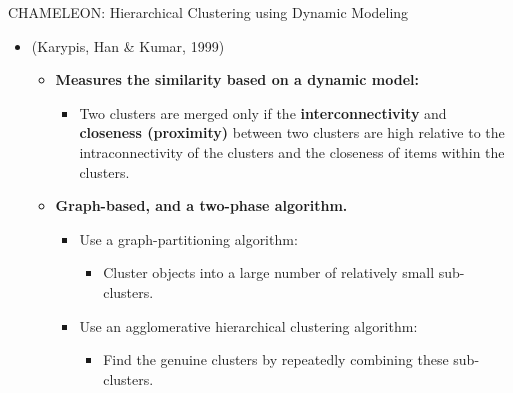 \begin{frame}{CHAMELEON: Hierarchical Clustering using Dynamic Modeling}
	\begin{itemize}
		\item (Karypis, Han \& Kumar, 1999)
		\begin{itemize}
			\item \textbf{Measures the similarity based on a dynamic model:}
			\begin{itemize}
				\item Two clusters are merged only if the 
				\textbf{interconnectivity} and \textbf{closeness (proximity)} 
				between two clusters are high relative to the intraconnectivity 
				of the clusters and the closeness of items within the clusters.
			\end{itemize}
			\item \textbf{Graph-based, and a two-phase algorithm.}
			\begin{itemize}
				\item Use a graph-partitioning algorithm:
				\begin{itemize}
					\item Cluster objects into a large number of relatively 
					small sub-clusters.
				\end{itemize}
				\item Use an agglomerative hierarchical clustering algorithm:
				\begin{itemize}
					\item Find the genuine clusters by repeatedly combining 
					these sub-clusters.
				\end{itemize}
			\end{itemize}
		\end{itemize}
	\end{itemize}
\end{frame}

